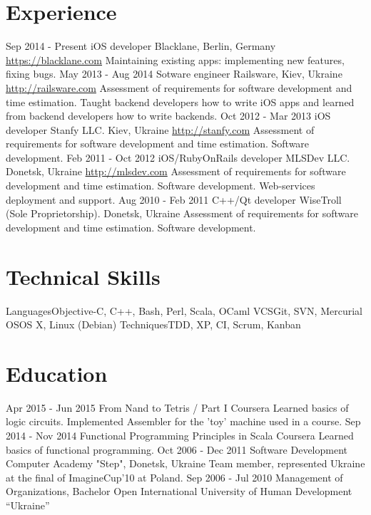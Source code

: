 \documentclass[11pt,a4paper]{moderncv}
\begin{document}
\section{Experience}
\cventry
  {Sep 2014 - Present}
  {iOS developer}
  {Blacklane, Berlin, Germany}
  {\newline{}\url{https://blacklane.com}}{}
  {Maintaining existing apps: implementing new features, fixing bugs.\newline{}}
\cventry
  {May 2013 - Aug 2014}
  {Sotware engineer}
  {Railsware, Kiev, Ukraine}
  {\newline{}\url{http://railsware.com}}{}
  {Assessment of requirements for software development and time estimation.\newline{}
  Taught backend developers how to write iOS apps and learned from backend developers how to write backends.}
\cventry
  {Oct 2012 - Mar 2013}
  {iOS developer}
  {Stanfy LLC. Kiev, Ukraine}
  {\newline{}\url{http://stanfy.com}}{}
  {Assessment of requirements for software development and time estimation. 
  \newline{}Software development.}
\cventry
  {Feb 2011 - Oct 2012}
  {iOS/RubyOnRails developer}
  {MLSDev LLC. Donetsk, Ukraine}
  {\newline{}\url{http://mlsdev.com}}{}
  {Assessment of requirements for software development and time estimation.\newline{}
  Software development. Web-services deployment and support.}
\cventry
  {Aug 2010 - Feb 2011}
  {C++/Qt developer}
  {WiseTroll (Sole Proprietorship). Donetsk, Ukraine}
  {}{}
  {Assessment of requirements for software development and time estimation. 
  \newline{}Software development.}

\section{Technical Skills}
\cvline
  {Languages}{Objective-C, C++, Bash, Perl, Scala, OCaml}
\cvline
  {VCS}{Git, SVN, Mercurial}
\cvline
  {OS}{OS X, Linux (Debian)}
\cvline
  {Techniques}{TDD, XP, CI, Scrum, Kanban}

\section{Education}
  \cventry
    {Apr 2015 - Jun 2015}
    {From Nand to Tetris / Part I}
    {Coursera}
    {}{}
    {Learned basics of logic circuits. Implemented Assembler for the 'toy' machine used in a course.}
  \cventry
    {Sep 2014 - Nov 2014}
    {Functional Programming Principles in Scala}
    {Coursera}
    {}{}
    {Learned basics of functional programming.}
  \cventry
    {Oct 2006 - Dec 2011}
    {Software Development}
    {Computer Academy "Step", Donetsk, Ukraine}
    {}{}
    {Team member, represented Ukraine at the final of ImagineCup'10 at Poland.}
  \cventry
    {Sep 2006 - Jul 2010}
    {Management of Organizations, Bachelor}
    {Open International University of Human Development “Ukraine”}
    {}{}{}
\end{document}
